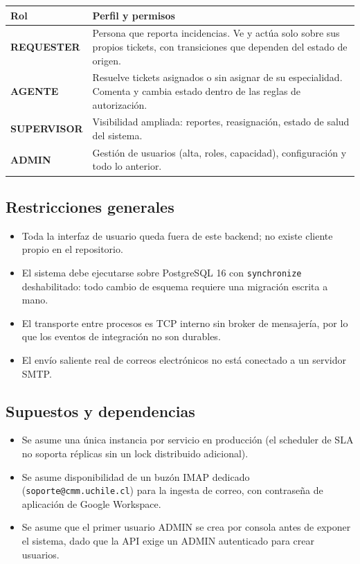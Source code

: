 \documentclass[11pt,a4paper]{article}
\begin{document}
\begin{longtable}{@{}>{\bfseries}p{2.6cm} L{11.6cm}@{}}
\toprule
\textbf{Rol} & \textbf{Perfil y permisos} \\
\midrule
\endhead
REQUESTER & Persona que reporta incidencias. Ve y actúa solo sobre sus propios tickets, con transiciones que dependen del estado de origen. \\
AGENTE & Resuelve tickets asignados o sin asignar de su especialidad. Comenta y cambia estado dentro de las reglas de autorización. \\
SUPERVISOR & Visibilidad ampliada: reportes, reasignación, estado de salud del sistema. \\
ADMIN & Gestión de usuarios (alta, roles, capacidad), configuración y todo lo anterior. \\
\bottomrule
\end{longtable}

\subsection{Restricciones generales}
\begin{itemize}[leftmargin=1.2cm]
  \item Toda la interfaz de usuario queda fuera de este backend; no existe cliente propio en el repositorio.
  \item El sistema debe ejecutarse sobre PostgreSQL 16 con \texttt{synchronize} deshabilitado: todo cambio de esquema requiere una migración escrita a mano.
  \item El transporte entre procesos es TCP interno sin broker de mensajería, por lo que los eventos de integración no son durables.
  \item El envío saliente real de correos electrónicos no está conectado a un servidor SMTP.
\end{itemize}

\subsection{Supuestos y dependencias}
\begin{itemize}[leftmargin=1.2cm]
  \item Se asume una única instancia por servicio en producción (el scheduler de SLA no soporta réplicas sin un lock distribuido adicional).
  \item Se asume disponibilidad de un buzón IMAP dedicado (\texttt{soporte@cmm.uchile.cl}) para la ingesta de correo, con contraseña de aplicación de Google Workspace.
  \item Se asume que el primer usuario ADMIN se crea por consola antes de exponer el sistema, dado que la API exige un ADMIN autenticado para crear usuarios.
\end{itemize}
\end{document}
